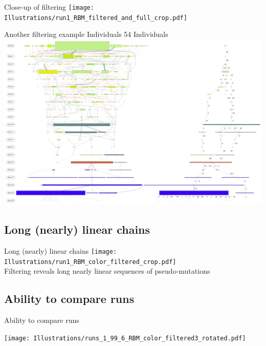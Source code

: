 \documentclass{beamer}
\begin{document}
\begin{frame}{Close-up of filtering}
\texttt{[image: Illustrations/run1\_RBM\_filtered\_and\_full\_crop.pdf]} 
\end{frame}
 
\begin{frame}{Another filtering example}
 Individuals \hspace{4.5cm} 54 Individuals \\
\includegraphics[height=.8\textheight]{Illustrations/run0_RBM_color_both_runs_40.pdf} 
\end{frame}

\subsection{Long (nearly) linear chains}
\begin{frame}{Long (nearly) linear chains}
\texttt{[image: Illustrations/run1\_RBM\_color\_filtered\_crop.pdf]}
\\
Filtering reveals long nearly linear sequences of pseudo-mutations
\end{frame}

\subsection{Ability to compare runs}

\begin{frame}{Ability to compare runs}
\begin{center}
\texttt{[image: Illustrations/runs\_1\_99\_6\_RBM\_color\_filtered3\_rotated.pdf]}
\end{center}
\end{frame}
\end{document}
